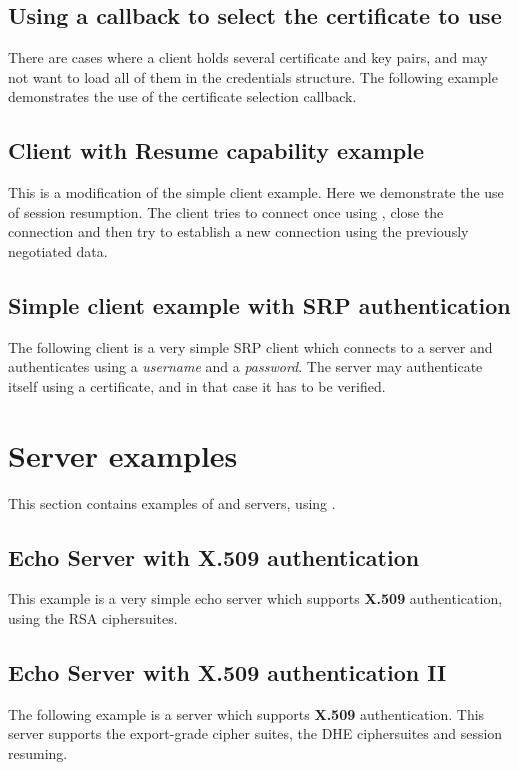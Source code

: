 

\subsection{Using a callback to select the certificate to use}
There are cases where a client holds several certificate and key pairs,
and may not want to load all of them in the credentials structure.
The following example demonstrates the use of the certificate selection callback.
\par




\subsection{Client with Resume capability example}
\label{resume-example}
This is a modification of the simple client example. Here we demonstrate
the use of session resumption. The client tries to connect once using
\tls{}, close the connection and then try to establish a new connection
using the previously negotiated data.


\subsection{Simple client example with SRP authentication}
The following client
is a very simple SRP \tls{} client which connects to a server 
and authenticates using a {\it username} and a {\it password}. The
server may authenticate itself using a certificate, and in that case it
has to be verified.


\section{Server examples}
This section contains examples of \tls{} and \ssl{} servers, using \gnutls{}.

\subsection{Echo Server with X.509 authentication}
This example is a very simple echo server which supports {\bf X.509} authentication,
using the RSA ciphersuites.


\subsection{Echo Server with X.509 authentication II}
The following example is a server which supports {\bf X.509} authentication.
This server supports the export-grade cipher suites, the DHE ciphersuites
and session resuming.



